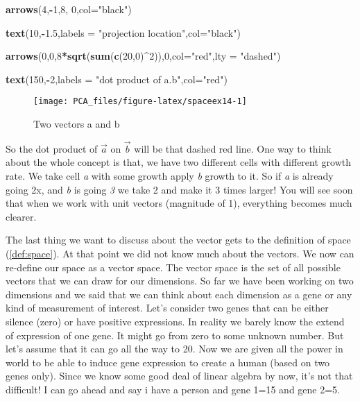 \documentclass[
]{book}
\newenvironment{Shaded}{\begin{snugshade}}{\end{snugshade}}
\newcommand{\DataTypeTok}[1]{\textcolor[rgb]{0.13,0.29,0.53}{#1}}
\newcommand{\DecValTok}[1]{\textcolor[rgb]{0.00,0.00,0.81}{#1}}
\newcommand{\FloatTok}[1]{\textcolor[rgb]{0.00,0.00,0.81}{#1}}
\newcommand{\KeywordTok}[1]{\textcolor[rgb]{0.13,0.29,0.53}{\textbf{#1}}}
\newcommand{\NormalTok}[1]{#1}
\newcommand{\OperatorTok}[1]{\textcolor[rgb]{0.81,0.36,0.00}{\textbf{#1}}}
\newcommand{\StringTok}[1]{\textcolor[rgb]{0.31,0.60,0.02}{#1}}
\theoremstyle{definition}
\theoremstyle{definition}
\theoremstyle{definition}
\theoremstyle{remark}
\begin{document}
\begin{Shaded}
\begin{Highlighting}[]
\KeywordTok{arrows}\NormalTok{(}\DecValTok{4}\NormalTok{,}\OperatorTok{-}\DecValTok{1}\NormalTok{,}\DecValTok{8}\NormalTok{, }\DecValTok{0}\NormalTok{,}\DataTypeTok{col=}\StringTok{"black"}\NormalTok{)}

\KeywordTok{text}\NormalTok{(}\DecValTok{10}\NormalTok{,}\OperatorTok{-}\FloatTok{1.5}\NormalTok{,}\DataTypeTok{labels =} \StringTok{"projection location"}\NormalTok{,}\DataTypeTok{col=}\StringTok{"black"}\NormalTok{)}


\KeywordTok{arrows}\NormalTok{(}\DecValTok{0}\NormalTok{,}\DecValTok{0}\NormalTok{,}\DecValTok{8}\OperatorTok{*}\KeywordTok{sqrt}\NormalTok{(}\KeywordTok{sum}\NormalTok{(}\KeywordTok{c}\NormalTok{(}\DecValTok{20}\NormalTok{,}\DecValTok{0}\NormalTok{)}\OperatorTok{^}\DecValTok{2}\NormalTok{)),}\DecValTok{0}\NormalTok{,}\DataTypeTok{col=}\StringTok{"red"}\NormalTok{,}\DataTypeTok{lty =} \StringTok{"dashed"}\NormalTok{)}

\KeywordTok{text}\NormalTok{(}\DecValTok{150}\NormalTok{,}\OperatorTok{-}\DecValTok{2}\NormalTok{,}\DataTypeTok{labels =} \StringTok{"dot product of a.b"}\NormalTok{,}\DataTypeTok{col=}\StringTok{"red"}\NormalTok{)}
\end{Highlighting}
\end{Shaded}

\begin{figure}

{\centering \texttt{[image: PCA\_files/figure-latex/spaceex14-1]} 

}

\caption{Two vectors a and b}\label{fig:spaceex14}
\end{figure}

So the dot product of \(\vec{a}\) on \(\vec{b}\) will be that dashed red line. One way to think about the whole concept is that, we have two different cells with different growth rate. We take cell \emph{a} with some growth apply \emph{b} growth to it. So if \emph{a} is already going 2x, and \emph{b} is going \emph{3} we take 2 and make it 3 times larger! You will see soon that when we work with unit vectors (magnitude of 1), everything becomes much clearer.

The last thing we want to discuss about the vector gets to the definition of space (\ref{def:space}). At that point we did not know much about the vectors. We now can re-define our space as a vector space. The vector space is the set of all possible vectors that we can draw for our dimensions. So far we have been working on two dimensions and we said that we can think about each dimension as a gene or any kind of measurement of interest. Let's consider two genes that can be either silence (zero) or have positive expressions. In reality we barely know the extend of expression of one gene. It might go from zero to some unknown number. But let's assume that it can go all the way to 20. Now we are given all the power in world to be able to induce gene expression to create a human (based on two genes only). Since we know some good deal of linear algebra by now, it's not that difficult! I can go ahead and say i have a person and gene 1=15 and gene 2=5.
\end{document}
